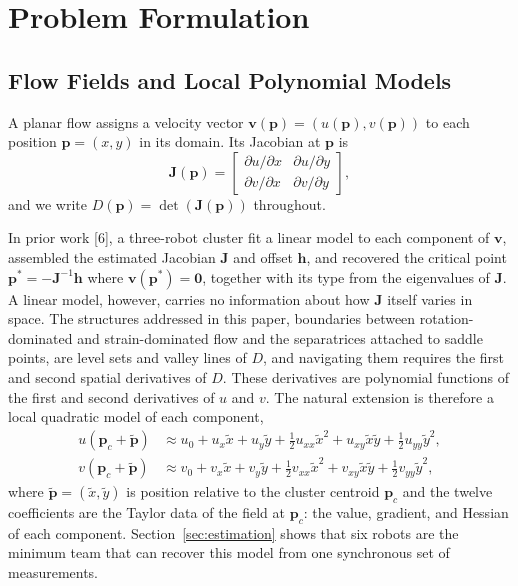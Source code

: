 \documentclass[lettersize,journal]{IEEEtran}
\begin{document}
\section{Problem Formulation}
\label{sec:detj_field}

\subsection{Flow Fields and Local Polynomial Models}

A planar flow assigns a velocity vector $\mathbf{v}(\mathbf{p}) =
(u(\mathbf{p}), v(\mathbf{p}))$ to each position $\mathbf{p} = (x, y)$ in its
domain. Its Jacobian at $\mathbf{p}$ is
\begin{equation}
    \mathbf{J}(\mathbf{p}) =
    \begin{bmatrix}
        \partial u / \partial x & \partial u / \partial y \\
        \partial v / \partial x & \partial v / \partial y
    \end{bmatrix},
    \label{eq:jacobian}
\end{equation}
and we write $D(\mathbf{p}) = \det(\mathbf{J}(\mathbf{p}))$ throughout.

In prior work [6], a three-robot cluster fit a linear model to each
component of $\mathbf{v}$, assembled the estimated Jacobian
$\mathbf{J}$ and offset $\mathbf{h}$, and recovered the critical point
$\mathbf{p}^* = -\mathbf{J}^{-1}\mathbf{h}$ where $\mathbf{v}(\mathbf{p}^*) =
\mathbf{0}$, together with its type from the eigenvalues of $\mathbf{J}$.
A linear model, however, carries no information about how $\mathbf{J}$
itself varies in space. The structures addressed in this paper, boundaries
between rotation-dominated and strain-dominated flow and the separatrices
attached to saddle points, are level sets and valley lines of $D$, and
navigating them requires the first and second spatial derivatives of $D$.
These derivatives are polynomial functions of the first and second
derivatives of $u$ and $v$. The natural extension is therefore a local
quadratic model of each component,
\begin{align}
    u(\mathbf{p}_c + \tilde{\mathbf{p}}) &\approx u_0 + u_x \tilde{x}
        + u_y \tilde{y} + \tfrac{1}{2} u_{xx} \tilde{x}^2
        + u_{xy} \tilde{x}\tilde{y} + \tfrac{1}{2} u_{yy} \tilde{y}^2,
        \label{eq:quad_model_u} \\
    v(\mathbf{p}_c + \tilde{\mathbf{p}}) &\approx v_0 + v_x \tilde{x}
        + v_y \tilde{y} + \tfrac{1}{2} v_{xx} \tilde{x}^2
        + v_{xy} \tilde{x}\tilde{y} + \tfrac{1}{2} v_{yy} \tilde{y}^2,
        \label{eq:quad_model_v}
\end{align}
where $\tilde{\mathbf{p}} = (\tilde{x}, \tilde{y})$ is position relative to
the cluster centroid $\mathbf{p}_c$ and the twelve coefficients are the
Taylor data of the field at $\mathbf{p}_c$: the value, gradient, and
Hessian of each component. Section~\ref{sec:estimation} shows that six
robots are the minimum team that can recover this model from one
synchronous set of measurements.
\end{document}
